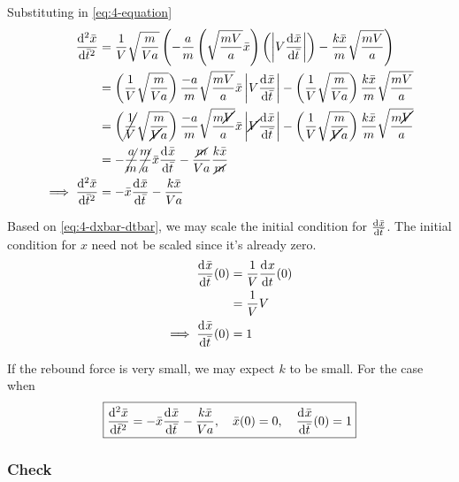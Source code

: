 \documentclass[12pt]{article}
\begin{document}
Substituting in \cref{eq:4-equation}
\begin{equation}
  \begin{aligned}
    \od[2]{\bar{x}}{\bar{t}} &= \frac{1}{V}\sqrt{\frac{m}{Va}} \left(
    -\frac{a}{m}\left( \sqrt{\frac{mV}{a}}\bar{x}\right) \left(
    \abs{V\od{\bar{x}}{\bar{t}}}\right) -
    \frac{k\bar{x}}{m}\sqrt{\frac{mV}{a}}\right) \\
    &= \left(\frac{1}{V}\sqrt{\frac{m}{Va}}\right)\frac{-a}{m}\sqrt{\frac{mV}{a}}\bar{x}
    \abs{V\od{\bar{x}}{\bar{t}}} -
    \left(\frac{1}{V}\sqrt{\frac{m}{Va}}\right)\frac{k\bar{x}}{m}\sqrt{\frac{mV}{a}} \\
    &= \left(\cancel{\frac{1}{V}}\sqrt{\frac{m}{\cancel{V}a}}\right)\frac{-a}{m}\sqrt{\frac{m\cancel{V}}{a}}\bar{x}
    \abs{\cancel{V}\od{\bar{x}}{\bar{t}}} -
    \left(\frac{1}{V}\sqrt{\frac{m}{\cancel{V}a}}\right)\frac{k\bar{x}}{m}\sqrt{\frac{m\cancel{V}}{a}} \\
    &= -\cancel{\frac{a}{m}}\cancel{\frac{m}{a}}\bar{x}\od{\bar{x}}{\bar{t}} -
    \frac{\cancel{m}}{Va}\frac{k\bar{x}}{\cancel{m}} \\
    \implies \od[2]{\bar{x}}{\bar{t}} &= -\bar{x}\od{\bar{x}}{\bar{t}} - \frac{k\bar{x}}{Va} \\
  \end{aligned}
\end{equation}

Based on \cref{eq:4-dxbar-dtbar}, we may scale the initial condition for
$\od{\bar{x}}{\bar{t}}$. The initial condition for $x$ need not be scaled since
it's already zero.
\begin{equation}
  \begin{aligned}
    \od{\bar{x}}{\bar{t}}(0) &= \frac{1}{V}\od{x}{t}(0) \\
     &= \frac{1}{V}V \\
    \implies \od{\bar{x}}{\bar{t}}(0) &= 1 \\
  \end{aligned}
\end{equation}

If the rebound force is very small, we may expect $k$ to be small. For the case when
\begin{equation} \boxed{
    \od[2]{\bar{x}}{\bar{t}} = -\bar{x}\od{\bar{x}}{\bar{t}} -
    \frac{k\bar{x}}{Va}, \quad \bar{x}(0)=0, \quad \od{\bar{x}}{\bar{t}}(0) = 1
  }
\end{equation}

\subsubsection*{Check}
\todo
\end{document}
